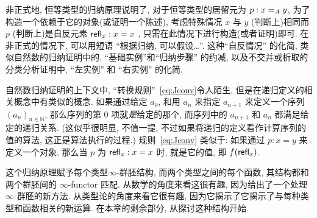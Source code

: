非正式地, 恒等类型的归纳原理说明了, 对于恒等类型的居留元为 $p:\id[A]xy$, 为了构造一个依赖于它的对象(或证明一个陈述), 考虑特殊情况 $x$ 与 $y$ (判断上)相同而 $p$ (判断上)是自反元素 $\refl{x}:x=x$ , 只需在此情况下进行构造(或者证明)即可.
在非正式的情况下, 可以用短语 ``根据归纳, 可以假设\dots''.
这种``自反情况'' 的化简, 类似自然数的归纳证明中的, ``基础实例''和``归纳步骤'' 的约减, 以及不交并或析取的分类分析证明中, ``左实例'' 和 ``右实例'' 的化简.
%


自然数归纳证明的上下文中, ``转换规则''~\eqref{eq:Jconv}令人陌生, 但是在递归定义的相关概念中有类似的概念.
如果通过给定 $a_0$, 和用 $a_n$ 来指定 $a_{n+1}$ 来定义一个序列 $(a_n)_{n\in \mathbb{N}}$, 那么序列的第 $0$ 项就\emph{是}给定的那个, 而序列中的 $a_{n+1}$ 和 $a_n$ 都满足给定的递归关系.
(这似乎很明显, 不值一提, 不过如果将递归的定义看作计算序列的值的算法, 这正是算法执行的过程.)
规则~\eqref{eq:Jconv} 类似于: 如果通过 $p:x=y$ 来定义一个对象, 那么当 $p$ 为 $\refl{x}:x=x$ 时, 就是它的值, 即 $f(\refl{x})$.

这个归纳原理赋予每个类型$\infty$-群胚结构, 而两个类型之间的每个函数, 其结构都和两个群胚间的 $\infty$-functor
%
匹配.
从数学的角度来看这很有趣, 因为给出了一个处理 $\infty$-群胚的新方法.
从类型论的角度来看它很有趣, 因为它揭示了它揭示了与每种类型和函数相关的新运算.
在本章的剩余部分, 从探讨这种结构开始.